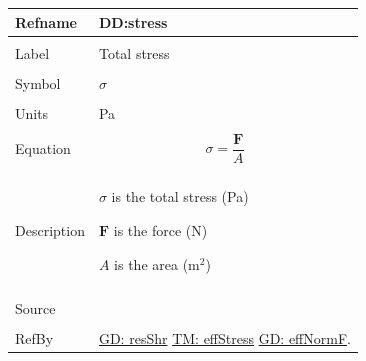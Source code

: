 \documentclass[12pt]{article}
\begin{document}
\noindent \begin{minipage}{\textwidth}
\begin{tabular}{p{} p{}}
\toprule \textbf{Refname} & \textbf{DD:stress}
\label{DD:stress}
\\ \midrule \\
Label & Total stress
        \\ \midrule \\
        Symbol & $σ$
                 \\ \midrule \\
                 Units & Pa
                         \\ \midrule \\
                         Equation & \begin{displaymath}
                                    σ=\frac{\mathbf{F}}{A}
                                    \end{displaymath}
                                    \\ \midrule \\
                                    Description & \begin{symbDescription}
                                                  \item{$σ$ is the total stress (Pa)}
                                                  \item{$\mathbf{F}$ is the force (N)}
                                                  \item{$A$ is the area ($\text{m}^{2}$)}
                                                  \end{symbDescription}
                                                  \\ \midrule \\
                                                  Source & \cite{huston2008}
                                                           \\ \midrule \\
                                                           RefBy & \hyperref[GD:resShr]{GD: resShr} \hyperref[TM:effStress]{TM: effStress} \hyperref[GD:effNormF]{GD: effNormF}.
\\ \bottomrule \end{tabular}
\end{minipage}
\par~
\end{document}
